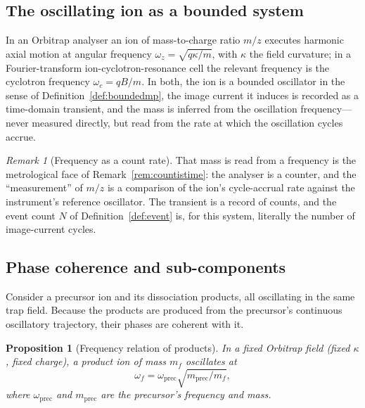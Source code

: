 \documentclass[11pt,a4paper]{article}
\theoremstyle{thmstyle}
\newtheorem{proposition}[theorem]{Proposition}
\theoremstyle{definition}
\theoremstyle{remark}
\newtheorem{remark}[theorem]{Remark}
\newcommand{\Count}{N}
\begin{document}
\subsection{The oscillating ion as a bounded system}
\label{sec:ion}

In an Orbitrap analyser \citep{makarov2000} an ion of mass-to-charge ratio
$m/z$ executes harmonic axial motion at angular frequency
$\omega_z=\sqrt{q\kappa/m}$, with $\kappa$ the field curvature; in a
Fourier-transform ion-cyclotron-resonance cell \citep{comisarow1974} the
relevant frequency is the cyclotron frequency $\omega_c=qB/m$. In both, the
ion is a bounded oscillator in the sense of Definition~\ref{def:boundedmp},
the image current it induces is recorded as a time-domain transient, and
the mass is inferred from the oscillation frequency---never measured
directly, but read from the rate at which the oscillation cycles accrue.

\begin{remark}[Frequency as a count rate]
\label{rem:freqcount}
That mass is read from a frequency is the metrological face of
Remark~\ref{rem:countistime}: the analyser is a counter, and the
``measurement'' of $m/z$ is a comparison of the ion's cycle-accrual rate
against the instrument's reference oscillator. The transient is a record of
counts, and the event count $\Count$ of Definition~\ref{def:event} is, for
this system, literally the number of image-current cycles.
\end{remark}

\subsection{Phase coherence and sub-components}
\label{sec:phasecoherence}

Consider a precursor ion and its dissociation products, all oscillating in
the same trap field. Because the products are produced from the precursor's
continuous oscillatory trajectory, their phases are coherent with it.

\begin{proposition}[Frequency relation of products]
\label{prop:productfreq}
In a fixed Orbitrap field (fixed $\kappa$, fixed charge), a product ion of
mass $m_f$ oscillates at
\begin{equation}
\omega_f=\omega_{\mathrm{prec}}\sqrt{m_{\mathrm{prec}}/m_f},
\label{eq:productfreq}
\end{equation}
where $\omega_{\mathrm{prec}}$ and $m_{\mathrm{prec}}$ are the precursor's
frequency and mass.
\end{proposition}
\end{document}
